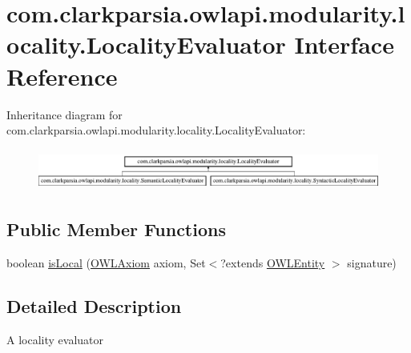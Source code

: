 \hypertarget{interfacecom_1_1clarkparsia_1_1owlapi_1_1modularity_1_1locality_1_1_locality_evaluator}{\section{com.\-clarkparsia.\-owlapi.\-modularity.\-locality.\-Locality\-Evaluator Interface Reference}
\label{interfacecom_1_1clarkparsia_1_1owlapi_1_1modularity_1_1locality_1_1_locality_evaluator}
}
Inheritance diagram for com.\-clarkparsia.\-owlapi.\-modularity.\-locality.\-Locality\-Evaluator\-:\begin{figure}[H]
\begin{center}
\leavevmode
\includegraphics[height=1.365854cm]{interfacecom_1_1clarkparsia_1_1owlapi_1_1modularity_1_1locality_1_1_locality_evaluator}
\end{center}
\end{figure}
\subsection*{Public Member Functions}
\begin{DoxyCompactItemize}
\item 
boolean \hyperlink{interfacecom_1_1clarkparsia_1_1owlapi_1_1modularity_1_1locality_1_1_locality_evaluator_ac1f64b947dda168188877efdd41a215f}{is\-Local} (\hyperlink{interfaceorg_1_1semanticweb_1_1owlapi_1_1model_1_1_o_w_l_axiom}{O\-W\-L\-Axiom} axiom, Set$<$?extends \hyperlink{interfaceorg_1_1semanticweb_1_1owlapi_1_1model_1_1_o_w_l_entity}{O\-W\-L\-Entity} $>$ signature)
\end{DoxyCompactItemize}


\subsection{Detailed Description}
A locality evaluator 

